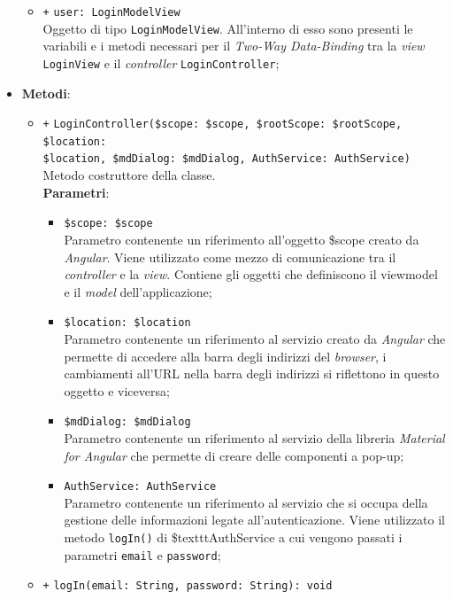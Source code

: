 \begin{itemize}
\begin{itemize}
		\item \texttt{+} \texttt{user: LoginModelView} \\
		Oggetto di tipo \texttt{LoginModelView}. All'interno di esso sono presenti le variabili e i metodi necessari per il \textit{Two-Way Data-Binding} tra la \textit{view} \texttt{LoginView} e il \textit{controller} \texttt{LoginController};
	\end{itemize}
	\item \textbf{Metodi}:
	\begin{itemize}
		\item \texttt{+} \texttt{LoginController(\$scope: \$scope, \$rootScope: \$rootScope, \$location:\\ \$location, \$mdDialog: \$mdDialog, AuthService: AuthService)} \\
		Metodo costruttore della classe. \\
		\textbf{Parametri}:
			\begin{itemize}
				\item \texttt{\$scope: \$scope} \\
				Parametro contenente un riferimento all’oggetto \$scope creato da \textit{Angular}. Viene utilizzato come mezzo di comunicazione tra il \textit{controller} e la \textit{view}. Contiene gli oggetti che definiscono il viewmodel e il \textit{model} dell'applicazione;
				\item \texttt{\$location: \$location} \\
				Parametro contenente un riferimento al servizio creato da \textit{Angular} che permette di accedere alla barra degli indirizzi del \textit{browser}, i cambiamenti all’URL nella barra degli indirizzi si riflettono in questo oggetto e viceversa;
				\item \texttt{\$mdDialog: \$mdDialog} \\
				Parametro contenente un riferimento al servizio della libreria \textit{Material for Angular} che permette di creare delle componenti a pop-up;
				\item \texttt{AuthService: AuthService} \\
				Parametro contenente un riferimento al servizio che si occupa della gestione delle informazioni legate all'autenticazione. Viene utilizzato il metodo \texttt{logIn()} di \$texttt{AuthService} a cui vengono passati i parametri \texttt{email} e \texttt{password};
			\end{itemize}
		\item \texttt{+} \texttt{logIn(email: String, password: String): void} \\

\end{itemize}
\end{itemize}
